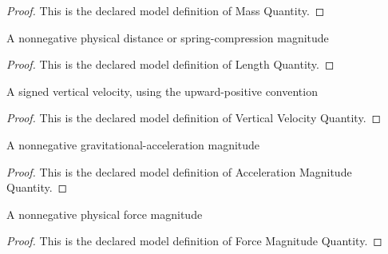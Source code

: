 \begin{proof}
  This is the declared model definition of Mass Quantity.
\end{proof}
\begin{definition}
  \label{def:physics:phyx-mini-0814:phyxminiproblems-problemphyxmini0814-lengthquantity}
  A nonnegative physical distance or spring-compression magnitude
\end{definition}
\begin{proof}
  This is the declared model definition of Length Quantity.
\end{proof}
\begin{definition}
  \label{def:physics:phyx-mini-0814:phyxminiproblems-problemphyxmini0814-verticalvelocityquantity}
  A signed vertical velocity, using the upward-positive convention
\end{definition}
\begin{proof}
  This is the declared model definition of Vertical Velocity Quantity.
\end{proof}
\begin{definition}
  \label{def:physics:phyx-mini-0814:phyxminiproblems-problemphyxmini0814-accelerationmagnitudequantity}
  A nonnegative gravitational-acceleration magnitude
\end{definition}
\begin{proof}
  This is the declared model definition of Acceleration Magnitude Quantity.
\end{proof}
\begin{definition}
  \label{def:physics:phyx-mini-0814:phyxminiproblems-problemphyxmini0814-forcemagnitudequantity}
  A nonnegative physical force magnitude
\end{definition}
\begin{proof}
  This is the declared model definition of Force Magnitude Quantity.
\end{proof}
